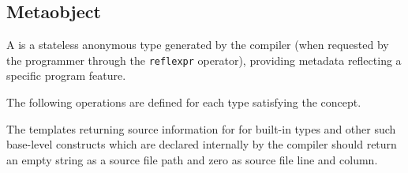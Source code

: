 \subsection{Metaobject}
\label{concept-Metaobject}

A  is a stateless anonymous type generated by the compiler
(when requested by the programmer through the \texttt{reflexpr} operator),
providing metadata reflecting a specific program feature.





The following operations are defined for each type satisfying the 
concept.



The templates returning source information for for built-in types and other
such base-level constructs which are declared internally by the compiler
should return an empty string as a source file path and zero as source file
line and column.
